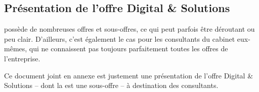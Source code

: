 \documentclass[a4paper, 12pt]{article}
\begin{document}

\begin{appendices}

\section{Présentation de l'offre Digital \& Solutions}

\tnp possède de nombreuses offres et sous-offres, ce qui peut parfois être déroutant ou peu clair. D'ailleurs, c'est également le cas pour les consultants du cabinet eux-mêmes, qui ne connaissent pas toujours parfaitement toutes les offres de l'entreprise.

Ce document joint en annexe est justement une présentation de l'offre Digital \& Solutions -- dont la \df est une sous-offre -- à destination des consultants.

%   
  
%   
 
\end{appendices}
\end{document}
